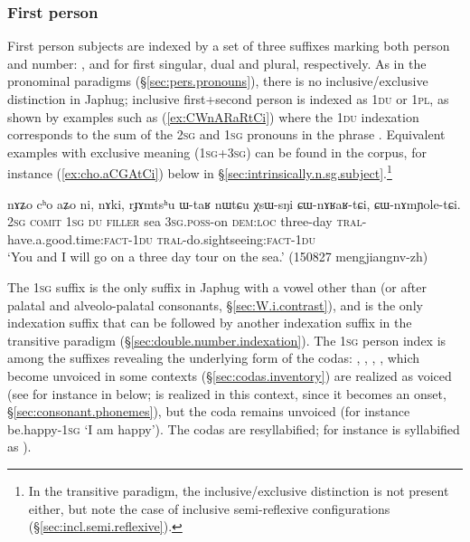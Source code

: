 \subsubsection{First person} \label{sec:intr.1}
First person subjects are indexed by a set of three suffixes marking both person and number: ,  and  for first singular, dual and plural, respectively. As in the pronominal paradigms (§\ref{sec:pers.pronouns}), there is no inclusive/exclusive distinction in Japhug; inclusive first+second person is indexed as \textsc{1du} or \textsc{1pl}, as shown by examples such as (\ref{ex:CWnARaRtCi}) where the \textsc{1du} indexation corresponds to the sum of the \textsc{2sg} and \textsc{1sg} pronouns in the phrase . Equivalent examples with exclusive meaning (\textsc{1sg}+\textsc{3sg}) can be found in the corpus, for instance (\ref{ex:cho.aCGAtCi}) below in §\ref{sec:intrinsically.n.sg.subject}.\footnote{In the transitive paradigm, the inclusive/exclusive distinction is not present either, but note the case of inclusive semi-reflex\-ive configurations (§\ref{sec:incl.semi.reflexive}).
}

\begin{exe}
\ex \label{ex:CWnARaRtCi}
\gll  nɤʑo cʰo aʑo ni, nɤki, rɟɤmtsʰu ɯ-taʁ nɯtɕu χsɯ-sŋi ɕɯ-nɤʁaʁ-tɕi, ɕɯ-nɤmɲole-tɕi. \\
\textsc{2sg} \textsc{comit} \textsc{1sg} \textsc{du} \textsc{filler} sea \textsc{3sg}.\textsc{poss}-on \textsc{dem}:\textsc{loc} three-day \textsc{tral}-have.a.good.time:\textsc{fact}-\textsc{1du} \textsc{tral}-do.sightseeing:\textsc{fact}-\textsc{1du} \\
\glt `You and I will go on a three day tour on the sea.' (150827 mengjiangnv-zh)
\end{exe}

The \textsc{1sg}  suffix is the only suffix in Japhug with a vowel other than  (or  after palatal and alveolo-palatal consonants, §\ref{sec:W.i.contrast}), and is the only indexation suffix that can be followed by another indexation suffix in the transitive paradigm (§\ref{sec:double.number.indexation}). The  \textsc{1sg} person index is among the suffixes revealing the underlying form of the codas: , , , , which become unvoiced in some contexts (§\ref{sec:codas.inventory}) are realized as voiced (see for instance in  below;  is realized  in this context, since it becomes an onset, §\ref{sec:consonant.phonemes}), but the coda  remains unvoiced (for instance  be.happy-\textsc{1sg} `I am happy'). The codas are resyllabified; for instance  is syllabified as ).

